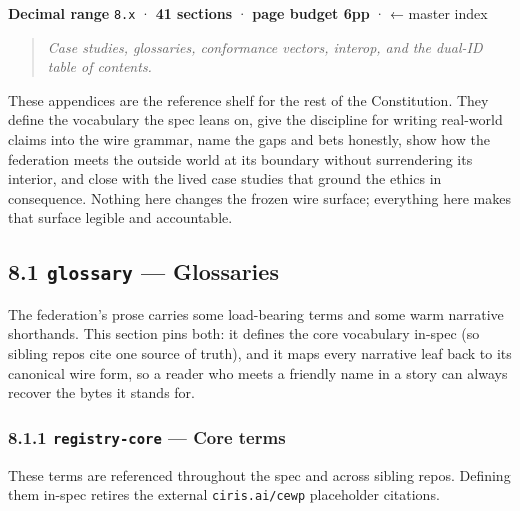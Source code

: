 \documentclass[11pt]{article}
\begin{document}
\textbf{Decimal range} \texttt{8.x} · \textbf{41 sections} · \textbf{page budget 6pp} · ← master index


\begin{quote}\itshape Case studies, glossaries, conformance vectors, interop, and the dual-ID table of contents.\end{quote}


These appendices are the reference shelf for the rest of the Constitution. They define the vocabulary the spec leans on, give the discipline for writing real-world claims into the wire grammar, name the gaps and bets honestly, show how the federation meets the outside world at its boundary without surrendering its interior, and close with the lived case studies that ground the ethics in consequence. Nothing here changes the frozen wire surface; everything here makes that surface legible and accountable.



\subsection*{8.1 \texttt{glossary} — Glossaries}


The federation's prose carries some load-bearing terms and some warm narrative shorthands. This section pins both: it defines the core vocabulary in-spec (so sibling repos cite one source of truth), and it maps every narrative leaf back to its canonical wire form, so a reader who meets a friendly name in a story can always recover the bytes it stands for.


\subsubsection*{8.1.1 \texttt{registry-core} — Core terms}


These terms are referenced throughout the spec and across sibling repos. Defining them in-spec retires the external \texttt{ciris.ai/cewp} placeholder citations.
\end{document}
